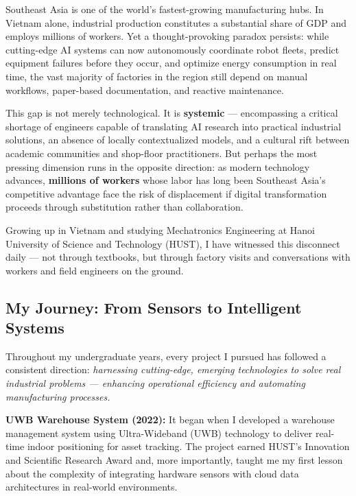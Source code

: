 \documentclass[
  12pt,
]{article}
\begin{document}
Southeast Asia is one of the world’s fastest-growing manufacturing hubs.
In Vietnam alone, industrial production constitutes a substantial share
of GDP and employs millions of workers. Yet a thought-provoking paradox
persists: while cutting-edge AI systems can now autonomously coordinate
robot fleets, predict equipment failures before they occur, and optimize
energy consumption in real time, the vast majority of factories in the
region still depend on manual workflows, paper-based documentation, and
reactive maintenance.

This gap is not merely technological. It is \textbf{systemic} —
encompassing a critical shortage of engineers capable of translating AI
research into practical industrial solutions, an absence of locally
contextualized models, and a cultural rift between academic communities
and shop-floor practitioners. But perhaps the most pressing dimension
runs in the opposite direction: as modern technology advances,
\textbf{millions of workers} whose labor has long been Southeast Asia’s
competitive advantage face the risk of displacement if digital
transformation proceeds through substitution rather than collaboration.

Growing up in Vietnam and studying Mechatronics Engineering at Hanoi
University of Science and Technology (HUST), I have witnessed this
disconnect daily — not through textbooks, but through factory visits and
conversations with workers and field engineers on the ground.

\hypertarget{my-journey-from-sensors-to-intelligent-systems}{%
\subsection{My Journey: From Sensors to Intelligent
Systems}\label{my-journey-from-sensors-to-intelligent-systems}}

Throughout my undergraduate years, every project I pursued has followed
a consistent direction: \emph{harnessing cutting-edge, emerging
technologies to solve real industrial problems — enhancing operational
efficiency and automating manufacturing processes.}

\textbf{UWB Warehouse System (2022):} It began when I developed a
warehouse management system using Ultra-Wideband (UWB) technology to
deliver real-time indoor positioning for asset tracking. The project
earned HUST’s Innovation and Scientific Research Award and, more
importantly, taught me my first lesson about the complexity of
integrating hardware sensors with cloud data architectures in real-world
environments.
\end{document}
